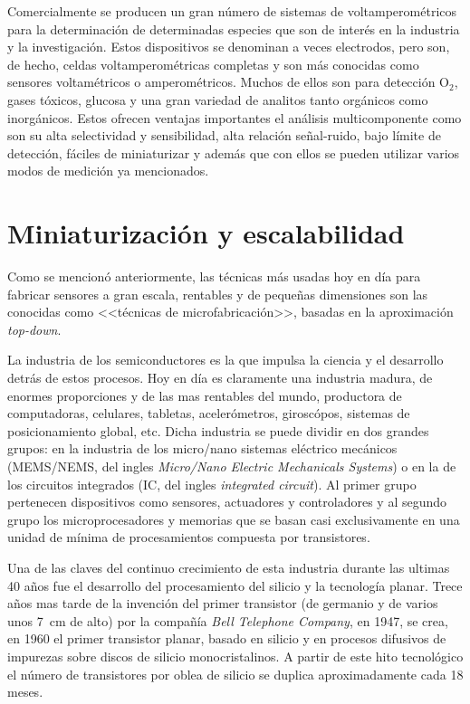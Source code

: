		Comercialmente se producen un gran número de sistemas de voltamperométricos para la determinación de determinadas especies que son de interés en la industria y la investigación. Estos dispositivos se denominan a veces electrodos, pero son, de hecho, celdas voltamperométricas completas y son más conocidas como sensores voltamétricos o amperométricos. Muchos de ellos son para detección O$_2$, gases tóxicos, glucosa y una gran variedad de analitos tanto orgánicos como inorgánicos. Estos ofrecen ventajas importantes el análisis multicomponente como son su alta selectividad y sensibilidad, alta relación señal-ruido, bajo límite de detección, fáciles de miniaturizar y además que con ellos se pueden utilizar varios modos de medición ya mencionados.\cite{bakker2006,stradiotto2003,harris2013,Ciosek2007,Kojima2003}
			
\section{Miniaturización y escalabilidad}\label{sec:microfabricacion}\label{sec:intro_fotolito}
		
		Como se mencionó anteriormente, las técnicas más usadas hoy en día para fabricar sensores a gran escala, rentables y de pequeñas dimensiones son las conocidas como <<técnicas de microfabricación>>, basadas en la aproximación \textit{top-down}. \cite{Jaeger2001}

		La industria de los semiconductores es la que impulsa la ciencia y el desarrollo detrás de estos procesos. Hoy en día es claramente una industria madura, de enormes proporciones y de las mas rentables del mundo, productora de computadoras, celulares, tabletas, acelerómetros, giroscópos, sistemas de posicionamiento global, etc. Dicha industria se puede dividir en dos grandes grupos: en la industria de los micro/nano sistemas eléctrico mecánicos (MEMS/NEMS, del ingles \textit{Micro/Nano Electric Mechanicals Systems}) o en la de los circuitos integrados (IC, del ingles \textit{integrated circuit}). Al primer grupo pertenecen dispositivos como sensores, actuadores y controladores y al segundo grupo los microprocesadores y memorias que se basan casi exclusivamente en una unidad de mínima de procesamientos compuesta por transistores.\cite{Franssila2004,Jaeger2001,Madou2002}

		Una de las claves del continuo crecimiento de esta industria durante las ultimas 40 años fue el desarrollo del procesamiento del silicio y la tecnología planar. Trece años mas tarde de la invención del primer transistor (de germanio y de varios unos \SI{7}{\cm} de alto) por la compañía \textit{Bell Telephone Company}, en 1947, se crea, en 1960 el primer transistor planar, basado en silicio y en procesos difusivos de impurezas sobre discos de silicio monocristalinos. A partir de este hito tecnológico el número de transistores por oblea de silicio se duplica aproximadamente cada 18 meses. \cite{moore2006,riordan1999,fagen1984}
		
